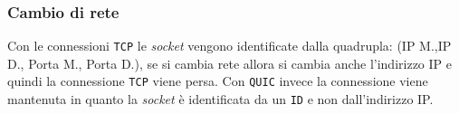         \subsubsection{Cambio di rete}
            Con le connessioni \texttt{TCP} le \textit{socket} vengono identificate dalla quadrupla: (IP M.,IP D., Porta M., Porta D.), se si cambia rete allora si cambia anche l'indirizzo IP e quindi la connessione \texttt{TCP} viene persa. Con \texttt{QUIC} invece la connessione viene mantenuta in quanto la \textit{socket} è identificata da un \texttt{ID} e non dall'indirizzo IP.